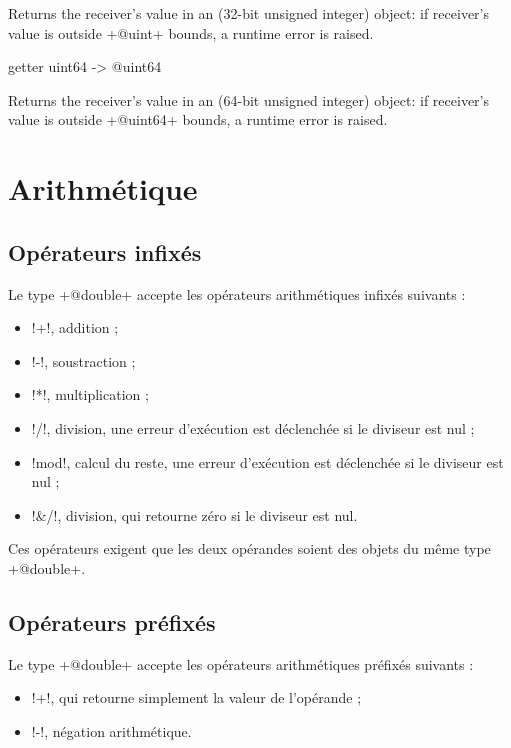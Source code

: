 Returns the receiver's value in an  (32-bit unsigned integer) object: if receiver's value is outside \ggs+@uint+ bounds, a runtime error is raised.






\begin{galgas}
getter uint64 -> @uint64
\end{galgas}

Returns the receiver's value in an  (64-bit unsigned integer) object: if receiver's value is outside \ggs+@uint64+ bounds, a runtime error is raised.



\section{Arithmétique}

\subsection{Opérateurs infixés}

Le type \ggs+@double+ accepte les opérateurs arithmétiques infixés suivants :
\begin{itemize}
  \item \ggs!+!, addition ;
  \item \ggs!-!, soustraction ;
  \item \ggs!*!, multiplication ;
  \item \ggs!/!, division, une erreur d'exécution est déclenchée si le diviseur est nul ;
  \item \ggs!mod!, calcul du reste, une erreur d'exécution est déclenchée si le diviseur est nul ;
  \item \ggs!&/!, division, qui retourne zéro si le diviseur est nul.
\end{itemize}

Ces opérateurs exigent que les deux opérandes soient des objets du même type \ggs+@double+. 

\subsection{Opérateurs préfixés}
Le type \ggs+@double+ accepte les opérateurs arithmétiques préfixés suivants :
\begin{itemize}
  \item \ggs!+!, qui retourne simplement la valeur de l'opérande ;
  \item \ggs!-!, négation arithmétique.
\end{itemize}

